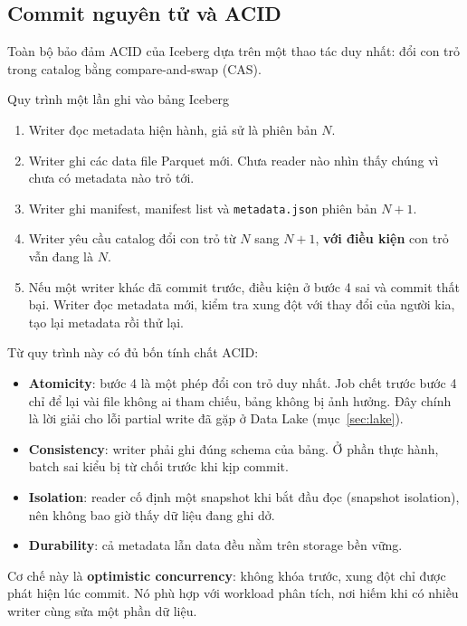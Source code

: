 \documentclass[12pt]{article}
\begin{document}
\subsection{Commit nguyên tử và ACID}

Toàn bộ bảo đảm ACID của Iceberg dựa trên một thao tác duy nhất: đổi con trỏ trong catalog bằng compare-and-swap (CAS).

\begin{examplebox}{Quy trình một lần ghi vào bảng Iceberg}
\begin{enumerate}
    \item Writer đọc metadata hiện hành, giả sử là phiên bản $N$.
    \item Writer ghi các data file Parquet mới. Chưa reader nào nhìn thấy chúng vì chưa có metadata nào trỏ tới.
    \item Writer ghi manifest, manifest list và \texttt{metadata.json} phiên bản $N+1$.
    \item Writer yêu cầu catalog đổi con trỏ từ $N$ sang $N+1$, \textbf{với điều kiện} con trỏ vẫn đang là $N$.
    \item Nếu một writer khác đã commit trước, điều kiện ở bước 4 sai và commit thất bại. Writer đọc metadata mới, kiểm tra xung đột với thay đổi của người kia, tạo lại metadata rồi thử lại.
\end{enumerate}
\end{examplebox}

Từ quy trình này có đủ bốn tính chất ACID:

\begin{itemize}
    \item \textbf{Atomicity}: bước 4 là một phép đổi con trỏ duy nhất. Job chết trước bước 4 chỉ để lại vài file không ai tham chiếu, bảng không bị ảnh hưởng. Đây chính là lời giải cho lỗi partial write đã gặp ở Data Lake (mục~\ref{sec:lake}).
    \item \textbf{Consistency}: writer phải ghi đúng schema của bảng. Ở phần thực hành, batch sai kiểu bị từ chối trước khi kịp commit.
    \item \textbf{Isolation}: reader cố định một snapshot khi bắt đầu đọc (snapshot isolation), nên không bao giờ thấy dữ liệu đang ghi dở.
    \item \textbf{Durability}: cả metadata lẫn data đều nằm trên storage bền vững.
\end{itemize}

Cơ chế này là \textbf{optimistic concurrency}: không khóa trước, xung đột chỉ được phát hiện lúc commit. Nó phù hợp với workload phân tích, nơi hiếm khi có nhiều writer cùng sửa một phần dữ liệu.
\end{document}
